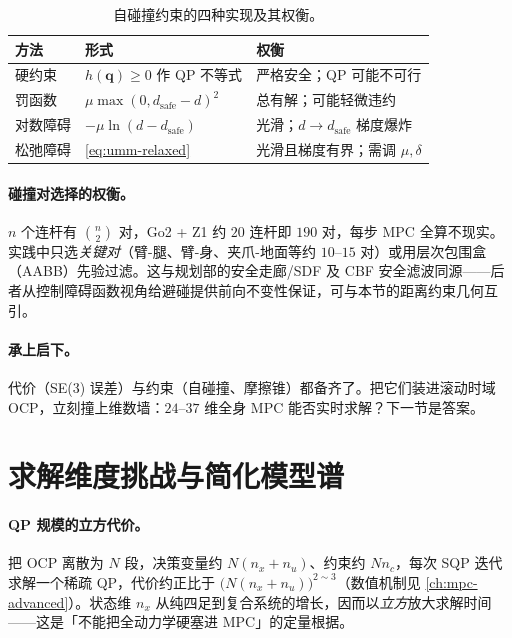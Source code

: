 \begin{table}[H]\centering\small
\caption{自碰撞约束的四种实现及其权衡。}
\label{tab:umm-barrier}
\begin{tabular}{lll}
\toprule
方法 & 形式 & 权衡 \\
\midrule
硬约束 & $h(\mathbf q)\ge0$ 作 QP 不等式 & 严格安全；QP 可能不可行 \\
罚函数 & $\mu\max(0,d_{\text{safe}}-d)^2$ & 总有解；可能轻微违约 \\
对数障碍 & $-\mu\ln(d-d_{\text{safe}})$ & 光滑；$d\to d_{\text{safe}}$ 梯度爆炸 \\
松弛障碍 & \cref{eq:umm-relaxed} & 光滑且梯度有界；需调 $\mu,\delta$ \\
\bottomrule
\end{tabular}
\end{table}

\paragraph{碰撞对选择的权衡。}
$n$ 个连杆有 $\binom n2$ 对，Go2 + Z1 约 $20$ 连杆即 $190$ 对，每步 MPC 全算不现实。实践中只选\emph{关键对}（臂-腿、臂-身、夹爪-地面等约 $10$--$15$ 对）或用层次包围盒（AABB）先验过滤。这与规划部的安全走廊/SDF 及 CBF 安全滤波同源——后者从控制障碍函数视角给避碰提供前向不变性保证，可与本节的距离约束几何互引。

\paragraph{承上启下。}
代价（SE(3) 误差）与约束（自碰撞、摩擦锥）都备齐了。把它们装进滚动时域 OCP，立刻撞上维数墙：$24$--$37$ 维全身 MPC 能否实时求解？下一节是答案。

\section{求解维度挑战与简化模型谱}
\label{sec:umm-model-spectrum}

\paragraph{QP 规模的立方代价。}
把 OCP 离散为 $N$ 段，决策变量约 $N(n_x+n_u)$、约束约 $Nn_c$，每次 SQP 迭代求解一个稀疏 QP，代价约正比于 $\big(N(n_x+n_u)\big)^{2\sim3}$（数值机制见 \cref{ch:mpc-advanced}）。状态维 $n_x$ 从纯四足到复合系统的增长，因而以\emph{立方}放大求解时间——这是「不能把全动力学硬塞进 MPC」的定量根据。

